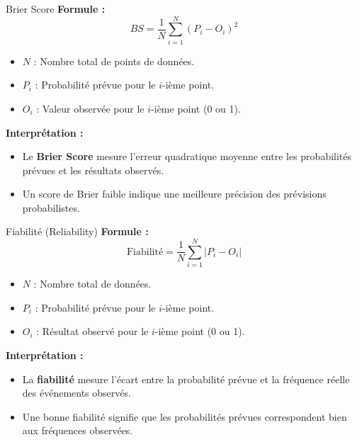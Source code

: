 \begin{frame}{Brier Score}
  \textbf{Formule :}
  \[
  BS = \frac{1}{N} \sum_{i=1}^N (P_i - O_i)^2
  \]
  \begin{itemize}
  \item \( N \) : Nombre total de points de données.
  \item \( P_i \) : Probabilité prévue pour le \(i\)-ième point.
  \item \( O_i \) : Valeur observée pour le \(i\)-ième point (0 ou 1).
  \end{itemize}
  
  \textbf{Interprétation :}
  \begin{itemize}
      \item Le \textbf{Brier Score} mesure l'erreur quadratique moyenne entre les probabilités prévues et les résultats observés.
      \item Un score de Brier faible indique une meilleure précision des prévisions probabilistes.
  \end{itemize}
\end{frame}
\begin{frame}{Fiabilité (Reliability)}
  \textbf{Formule :}
  \[
  \text{Fiabilité} = \frac{1}{N} \sum_{i=1}^N \left| P_i - O_i \right|
  \]
  \begin{itemize}
  \item \( N \) : Nombre total de données.
  \item \( P_i \) : Probabilité prévue pour le \(i\)-ième point.
  \item \( O_i \) : Résultat observé pour le \(i\)-ième point (0 ou 1).
  \end{itemize}
  
  \textbf{Interprétation :}
  \begin{itemize}
      \item La \textbf{fiabilité} mesure l'écart entre la probabilité prévue et la fréquence réelle des événements observés.
      \item Une bonne fiabilité signifie que les probabilités prévues correspondent bien aux fréquences observées.
  \end{itemize}
\end{frame}


